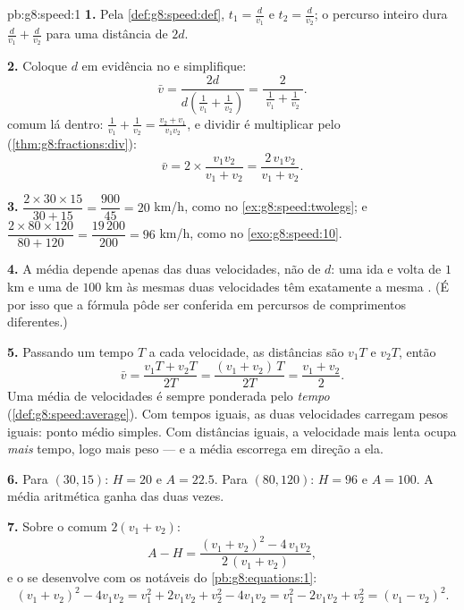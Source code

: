 \begin{solution}{pb:g8:speed:1}
\textbf{1.} Pela \cref{def:g8:speed:def}, $t_1 = \frac{d}{v_1}$ e
$t_2 = \frac{d}{v_2}$; o percurso inteiro dura
$\frac{d}{v_1} + \frac{d}{v_2}$ para uma distância de $2d$.

\textbf{2.} Coloque $d$ em evidência no  e simplifique:
\[
\bar v
= \frac{2d}{d\left(\frac{1}{v_1} + \frac{1}{v_2}\right)}
= \frac{2}{\ \frac{1}{v_1} + \frac{1}{v_2}\ } .
\]
 comum lá dentro:
$\frac{1}{v_1} + \frac{1}{v_2} = \frac{v_2 + v_1}{v_1 v_2}$, e dividir
é multiplicar pelo  (\cref{thm:g8:fractions:div}):
\[
\bar v = 2 \times \frac{v_1 v_2}{v_1 + v_2}
= \frac{2\, v_1 v_2}{v_1 + v_2} .
\]

\textbf{3.} $\dfrac{2 \times 30 \times 15}{30 + 15}
= \dfrac{900}{45} = 20$ km/h, como no
\cref{ex:g8:speed:twolegs}; e
$\dfrac{2 \times 80 \times 120}{80 + 120} = \dfrac{19\,200}{200}
= 96$ km/h, como no \cref{exo:g8:speed:10}.

\textbf{4.} A média depende apenas das duas velocidades, não de $d$:
uma ida e volta de $1$ km e uma de $100$ km às mesmas duas velocidades
têm exatamente a mesma . (É por isso que a fórmula pôde
ser conferida em percursos de comprimentos diferentes.)

\textbf{5.} Passando um tempo $T$ a cada velocidade, as distâncias são
$v_1 T$ e $v_2 T$, então
\[
\bar v = \frac{v_1 T + v_2 T}{2T}
= \frac{(v_1 + v_2)\,T}{2T}
= \frac{v_1 + v_2}{2} .
\]
Uma média de velocidades é sempre ponderada pelo \emph{tempo}
(\cref{def:g8:speed:average}). Com tempos iguais, as duas velocidades
carregam pesos iguais: ponto médio simples. Com distâncias iguais, a
velocidade mais lenta ocupa \emph{mais} tempo, logo mais peso --- e a
média escorrega em direção a ela.

\textbf{6.} Para $(30, 15)$: $H = 20$ e $A = 22.5$. Para $(80, 120)$:
$H = 96$ e $A = 100$. A média aritmética ganha das duas vezes.

\textbf{7.} Sobre o  comum $2(v_1 + v_2)$:
\[
A - H
= \frac{(v_1 + v_2)^2 - 4\, v_1 v_2}{2\,(v_1 + v_2)} ,
\]
e o  se desenvolve com os  notáveis do
\cref{pb:g8:equations:1}:
\[
(v_1 + v_2)^2 - 4 v_1 v_2
= v_1^2 + 2 v_1 v_2 + v_2^2 - 4 v_1 v_2
= v_1^2 - 2 v_1 v_2 + v_2^2
= (v_1 - v_2)^2 .
\]


\end{solution}
